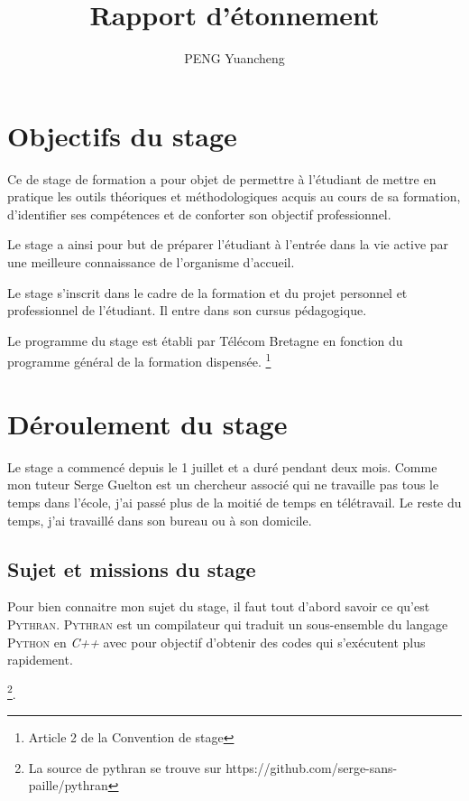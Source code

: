 \documentclass[a4paper, 11pt]{article}
\newcommand\Pythran{\textsc{Pythran}}
\newcommand\Python{\textsc{Python}}
\begin{document}
\title{Rapport d'étonnement}
\author{PENG Yuancheng}
\maketitle

\tableofcontents
\setcounter{tocdepth}{3}

\section{Objectifs du stage}

Ce de stage de formation a pour objet de permettre à l'étudiant de mettre en
pratique les outils théoriques et méthodologiques acquis au cours de sa
formation, d'identifier ses compétences et de conforter son objectif
professionnel.

Le stage a ainsi pour but de préparer l'étudiant à l'entrée dans la vie active
par une meilleure connaissance de l'organisme d'accueil.

Le stage s'inscrit dans le cadre de la formation et du projet personnel et
professionnel de l'étudiant. Il entre dans son cursus pédagogique.

Le programme du stage est établi par Télécom Bretagne en fonction du programme
général de la formation dispensée. \footnote{Article 2 de la Convention de stage}

\section{Déroulement du stage}
\label{sec:deroulement-stage}

Le stage a commencé depuis le 1 juillet et a duré pendant deux mois.
Comme mon tuteur Serge Guelton est un chercheur associé qui ne travaille
pas tous le temps dans l'école, j'ai passé plus de la moitié de temps en
télétravail. Le reste du temps, j'ai travaillé dans son bureau ou à son domicile.

\subsection*{Sujet et missions du stage}

Pour bien connaitre mon sujet du stage, il faut tout d'abord savoir ce qu'est
\Pythran{}. \Pythran{} est un compilateur qui traduit un sous-ensemble du
langage \Python{} en \emph{C++} avec pour objectif d'obtenir des codes qui
s'exécutent plus rapidement.

\footnote{La source de pythran se trouve sur
https://github.com/serge-sans-paille/pythran}.
\end{document}
